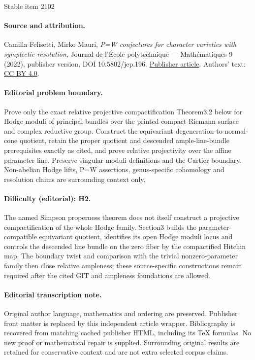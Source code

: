 \documentclass[11pt]{article}
\theoremstyle{definition}
\begin{document}
\begin{center}{\Large Stable item 2102}\end{center}
\paragraph{Source and attribution.}
Camilla Felisetti, Mirko Mauri, \emph{P=W conjectures for character varieties with symplectic resolution}, Journal de l’École polytechnique — Mathématiques 9 (2022), publisher version, DOI 10.5802/jep.196. \href{https://jep.centre-mersenne.org/articles/10.5802/jep.196/}{Publisher article}. Authors' text: \href{https://creativecommons.org/licenses/by/4.0/}{CC BY 4.0}.
\paragraph{Editorial problem boundary.}
Prove only the exact relative projective compactification Theorem3.2 below for Hodge moduli of principal bundles over the printed compact Riemann surface and complex reductive group. Construct the equivariant degeneration-to-normal-cone quotient, retain the proper quotient and descended ample-line-bundle prerequisites exactly as cited, and prove relative projectivity over the affine parameter line. Preserve singular-moduli definitions and the Cartier boundary. Non-abelian Hodge lifts, P=W assertions, genus-specific cohomology and resolution claims are surrounding context only.
\paragraph{Difficulty (editorial): H2.}
The named Simpson properness theorem does not itself construct a projective compactification of the whole Hodge family. Section3 builds the parameter-compatible equivariant quotient, identifies its open Hodge moduli locus and controls the descended line bundle on the zero fiber by the compactified Hitchin map. The boundary twist and comparison with the trivial nonzero-parameter family then close relative ampleness; these source-specific constructions remain required after the cited GIT and ampleness foundations are allowed.
\paragraph{Editorial transcription note.}
Original author language, mathematics and ordering are preserved. Publisher front matter is replaced by this independent article wrapper. Bibliography is recovered from matching cached publisher HTML, including its TeX formulas. No new proof or mathematical repair is supplied. Surrounding original results are retained for conservative context and are not extra selected corpus claims.
\clearpage
\end{document}
